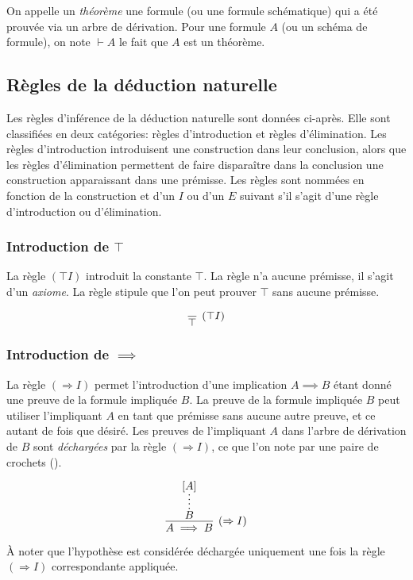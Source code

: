 On appelle un \og \textit{théorème} \fg{} une formule (ou une formule schématique) qui a été prouvée via un arbre de dérivation.
Pour une formule $A$ (ou un schéma de formule), on note $\vdash A$ le fait que $A$ est un théorème.

\subsection{Règles de la déduction naturelle}

Les règles d'inférence de la déduction naturelle sont données ci-après.
Elle sont classifiées en deux catégories: règles d'introduction et règles d'élimination.
Les règles d'introduction introduisent une construction dans leur conclusion,
alors que les règles d'élimination permettent de faire disparaître dans la conclusion une construction apparaissant dans une prémisse.
Les règles sont nommées en fonction de la construction et d'un $I$ ou d'un $E$ suivant s'il s'agit d'une règle d'introduction ou d'élimination.

\subsubsection{Introduction de $\top$}

La règle $({\top}I)$ introduit la constante $\top$.
La règle n'a aucune prémisse, il s'agit d'un \textit{axiome}.
La règle stipule que l'on peut prouver $\top$ sans aucune prémisse.

\[
\infer[({\top}I)]{\top}{}
\]

\subsubsection{Introduction de $\implies$}

La règle $({\Rightarrow{}}I)$ permet l'introduction d'une implication $A \implies B$ étant donné une preuve de la formule impliquée $B$.
La preuve de la formule impliquée $B$ peut utiliser l'impliquant $A$ en tant que prémisse sans aucune autre preuve, et ce autant de fois que désiré.
Les preuves de l'impliquant $A$ dans l'arbre de dérivation de $B$ sont \og \textit{déchargées} \fg{} par la règle $({\Rightarrow{}}I)$, ce que l'on note par une paire de crochets (\og [ \fg{} et \og ] \fg{}).

\[
\infer[({\Rightarrow{}}I)]{A \implies B}{\infer*{B}{[A]}}
\]

À noter que l'hypothèse est considérée déchargée uniquement une fois la règle $({\Rightarrow{}}I)$ correspondante appliquée.

